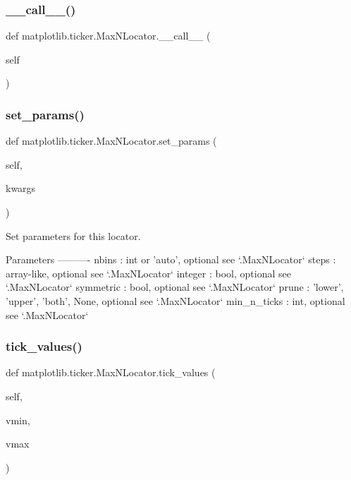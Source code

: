 \subsubsection{\texorpdfstring{\+\_\+\+\_\+call\+\_\+\+\_\+()}{\_\_call\_\_()}}
{\footnotesize\ttfamily def matplotlib.\+ticker.\+Max\+N\+Locator.\+\_\+\+\_\+call\+\_\+\+\_\+ (\begin{DoxyParamCaption}\item[{}]{self }\end{DoxyParamCaption})}

\mbox{\label{classmatplotlib_1_1ticker_1_1MaxNLocator_ad4fcbde5dafcc6b16f69aba87a8f0504}} 
\subsubsection{\texorpdfstring{set\+\_\+params()}{set\_params()}}
{\footnotesize\ttfamily def matplotlib.\+ticker.\+Max\+N\+Locator.\+set\+\_\+params (\begin{DoxyParamCaption}\item[{}]{self,  }\item[{}]{kwargs }\end{DoxyParamCaption})}

\begin{DoxyVerb}Set parameters for this locator.

Parameters
----------
nbins : int or 'auto', optional
    see `.MaxNLocator`
steps : array-like, optional
    see `.MaxNLocator`
integer : bool, optional
    see `.MaxNLocator`
symmetric : bool, optional
    see `.MaxNLocator`
prune : {'lower', 'upper', 'both', None}, optional
    see `.MaxNLocator`
min_n_ticks : int, optional
    see `.MaxNLocator`
\end{DoxyVerb}
 \mbox{\label{classmatplotlib_1_1ticker_1_1MaxNLocator_a522013809076312c55a3be93b20fa27f}} 
\subsubsection{\texorpdfstring{tick\+\_\+values()}{tick\_values()}}
{\footnotesize\ttfamily def matplotlib.\+ticker.\+Max\+N\+Locator.\+tick\+\_\+values (\begin{DoxyParamCaption}\item[{}]{self,  }\item[{}]{vmin,  }\item[{}]{vmax }\end{DoxyParamCaption})}

